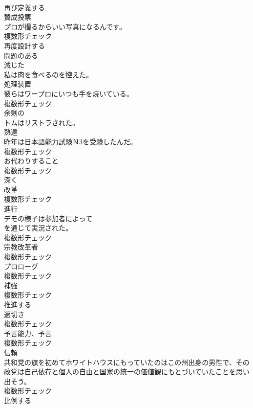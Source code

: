 \documentclass[8pt]{extreport}
\begin{document}
\begin{CJK}{UTF8}{min}
\\	[動詞]	再び定義する	
\\	[名詞]	賛成投票	
\\	プロが撮るからいい写真になるんです。	
\\	複数形チェック
\\	[動詞]	再度設計する	
\\	[形容詞]	問題のある	
\\	[形容詞]	減じた	
\\	私は肉を食べるのを控えた。	
\\	[名詞]	処理装置	
\\	彼らはワープロにいつも手を焼いている。	
\\	複数形チェック
\\	[形容詞]	余剰の	
\\	トムはリストラされた。	
\\	[名詞]	熟達	
\\	昨年は日本語能力試験Ｎ3を受験したんだ。	
\\	複数形チェック
\\	[名詞]	お代わりすること	
\\	複数形チェック
\\	[副詞]	深く	
\\	[名詞]	改革	
\\	複数形チェック
\\	[名詞]	進行	
\\	デモの様子は参加者によって
\\	を通じて実況された。	
\\	複数形チェック
\\	[名詞]	宗教改革者	
\\	複数形チェック
\\	[名詞]	プロローグ	
\\	複数形チェック
\\	[名詞]	補強	
\\	複数形チェック
\\	[動詞]	推進する	
\\	[名詞]	適切さ	
\\	複数形チェック
\\	[名詞]	予言能力、予言	
\\	複数形チェック
\\	[名詞]	信頼	
\\	共和党の旗を初めてホワイトハウスにもっていたのはこの州出身の男性で、その政党は自己依存と個人の自由と国家の統一の価値観にもとづいていたことを思い出そう。	
\\	複数形チェック
\\	[形容詞]	比例する	

\end{CJK}
\end{document}
